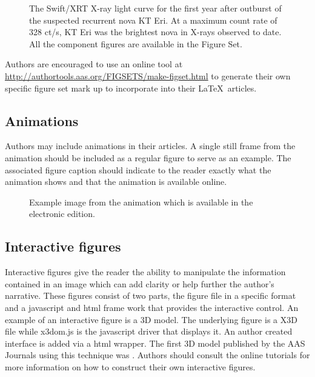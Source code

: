 \documentclass{aastex62}
\newcommand\latex{La\TeX}
\begin{document}
\figsetgrpstart
{}
\figsetgrpend

\figsetend

\begin{figure}
\caption{The Swift/XRT X-ray light curve for the first year after
outburst of the suspected recurrent nova KT Eri. At a maximum count rate of 
328 ct/s, KT Eri was the brightest nova in X-rays observed to date. All 
the component figures are available in the Figure Set. \label{fig:fig4}}
\end{figure}

Authors are encouraged to use an online tool at
\url{http://authortools.aas.org/FIGSETS/make-figset.html} to generate their
own specific figure set mark up to incorporate into their \latex\ articles.

\subsection{Animations}

Authors may include animations in their articles.  A single still frame from 
the animation should be included as a regular figure to serve as an example.
The associated figure caption should indicate to the reader exactly what the
animation shows and that the animation is available online.

\begin{figure}
\caption{Example image from the animation which is available in the electronic
edition.}
\end{figure}

\subsection{Interactive figures}

Interactive figures give the reader the ability to manipulate the
information contained in an image which can add clarity or help further the
author's narrative.  These figures consist of two parts, the figure file in
a specific format and a javascript and html frame work that provides the
interactive control.  An example of an interactive figure is a 3D model.
The underlying figure is a X3D file while x3dom.js is the javascript driver
that displays it. An author created interface is added via a html wrapper.
The first 3D model published by the AAS Journals using this technique was
\citet{2014ApJ...793..127V}.  Authors should consult the online tutorials
for more information on how to construct their own interactive figures.
\end{document}
